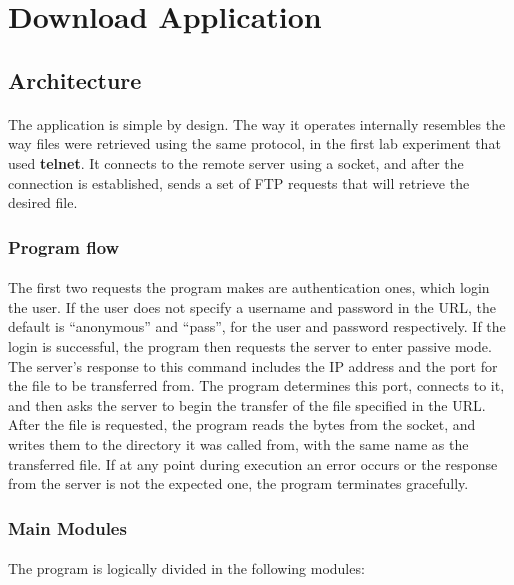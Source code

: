 \documentclass[11pt]{article}
\begin{document}
\section*{Download Application}

\subsection*{Architecture}

\paragraph{}The application is simple by design. The way it operates internally resembles the way files were retrieved using the same protocol, in the first lab experiment that used \textbf{telnet}. It connects to the remote server using a socket, and after the connection is established, sends a set of FTP requests that will retrieve the desired file.

\subsubsection*{Program flow}

\paragraph{}The first two requests the program makes are authentication ones, which login the user. If the user does not specify a username and password in the URL, the default is ``anonymous'' and ``pass'', for the user and password respectively. If the login is successful, the program then requests the server to enter passive mode. The server's response to this command includes the IP address and the port for the file to be transferred from. The program determines this port, connects to it, and then asks the server to begin the transfer of the file specified in the URL. After the file is requested, the program reads the bytes from the socket, and writes them to the directory it was called from, with the same name as the transferred file. If at any point during execution an error occurs or the response from the server is not the expected one, the program terminates gracefully.

\subsubsection*{Main Modules}

\paragraph{}The program is logically divided in the following modules:
\end{document}
